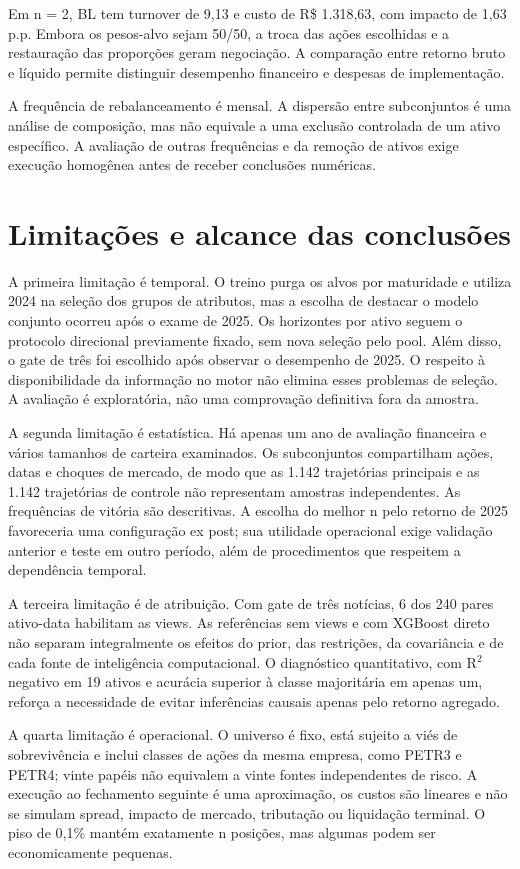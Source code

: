 Em n = 2, BL tem turnover de 9,13 e custo de R\$ 1.318,63, com impacto de 1,63 p.p. Embora os pesos-alvo sejam 50/50, a troca das ações escolhidas e a restauração das proporções geram negociação. A comparação entre retorno bruto e líquido permite distinguir desempenho financeiro e despesas de implementação.

A frequência de rebalanceamento é mensal. A dispersão entre subconjuntos é uma análise de composição, mas não equivale a uma exclusão controlada de um ativo específico. A avaliação de outras frequências e da remoção de ativos exige execução homogênea antes de receber conclusões numéricas.

\section{Limitações e alcance das conclusões}
A primeira limitação é temporal. O treino purga os alvos por maturidade e utiliza 2024 na seleção dos grupos de atributos, mas a escolha de destacar o modelo conjunto ocorreu após o exame de 2025. Os horizontes por ativo seguem o protocolo direcional previamente fixado, sem nova seleção pelo pool. Além disso, o gate de três foi escolhido após observar o desempenho de 2025. O respeito à disponibilidade da informação no motor não elimina esses problemas de seleção. A avaliação é exploratória, não uma comprovação definitiva fora da amostra.

A segunda limitação é estatística. Há apenas um ano de avaliação financeira e vários tamanhos de carteira examinados. Os subconjuntos compartilham ações, datas e choques de mercado, de modo que as 1.142 trajetórias principais e as 1.142 trajetórias de controle não representam amostras independentes. As frequências de vitória são descritivas. A escolha do melhor n pelo retorno de 2025 favoreceria uma configuração ex post; sua utilidade operacional exige validação anterior e teste em outro período, além de procedimentos que respeitem a dependência temporal.

A terceira limitação é de atribuição. Com gate de três notícias, 6 dos 240 pares ativo-data habilitam as views. As referências sem views e com XGBoost direto não separam integralmente os efeitos do prior, das restrições, da covariância e de cada fonte de inteligência computacional. O diagnóstico quantitativo, com R$^2$ negativo em 19 ativos e acurácia superior à classe majoritária em apenas um, reforça a necessidade de evitar inferências causais apenas pelo retorno agregado.

A quarta limitação é operacional. O universo é fixo, está sujeito a viés de sobrevivência e inclui classes de ações da mesma empresa, como PETR3 e PETR4; vinte papéis não equivalem a vinte fontes independentes de risco. A execução ao fechamento seguinte é uma aproximação, os custos são lineares e não se simulam spread, impacto de mercado, tributação ou liquidação terminal. O piso de 0,1\% mantém exatamente n posições, mas algumas podem ser economicamente pequenas.

